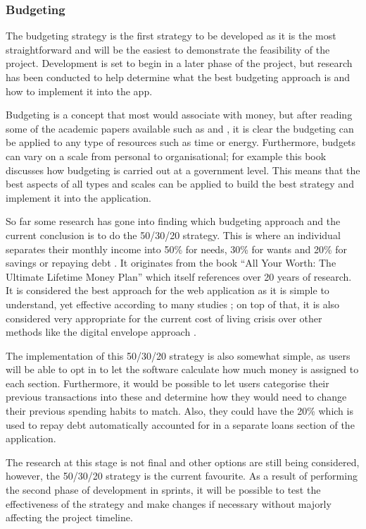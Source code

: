 \subsubsection{Budgeting}
The budgeting strategy is the first strategy to be developed as it is the most straightforward and will be the easiest to demonstrate the feasibility of the project. Development is set to begin in a later phase of the project, but research has been conducted to help determine what the best budgeting approach is and how to implement it into the app.

Budgeting is a concept that most would associate with money, but after reading some of the academic papers available such as \cite{hansen2003practice} and \cite{shim2011budgeting}, it is clear the budgeting can be applied to any type of resources such as time or energy. Furthermore, budgets can vary on a scale from personal to organisational; for example this book \cite{wildavsky1986budgeting} discusses how budgeting is carried out at a government level. This means that the best aspects of all types and scales can be applied to build the best strategy and implement it into the application.

So far some research has gone into finding which budgeting approach and the current conclusion is to do the 50/30/20 strategy. This is where an individual separates their monthly income into 50\% for needs, 30\% for wants and 20\% for savings or repaying debt \cite{503020Strategy}. It originates from the book ``All Your Worth: The Ultimate Lifetime Money Plan'' \cite{warren2005all} which itself references over 20 years of research. It is considered the best approach for the web application as it is simple to understand, yet effective according to many studies \cite{503020Examples}; on top of that, it is also considered very appropriate for the current cost of living crisis over other methods like the digital envelope approach \cite{503020InCostLivingCrisis}.

The implementation of this 50/30/20 strategy is also somewhat simple, as users will be able to opt in to let the software calculate how much money is assigned to each section. Furthermore, it would be possible to let users categorise their previous transactions into these and determine how they would need to change their previous spending habits to match. Also, they could have the 20\% which is used to repay debt automatically accounted for in a separate loans section of the application.

The research at this stage is not final and other options are still being considered, however, the 50/30/20 strategy is the current favourite. As a result of performing the second phase of development in sprints, it will be possible to test the effectiveness of the strategy and make changes if necessary without majorly affecting the project timeline.

